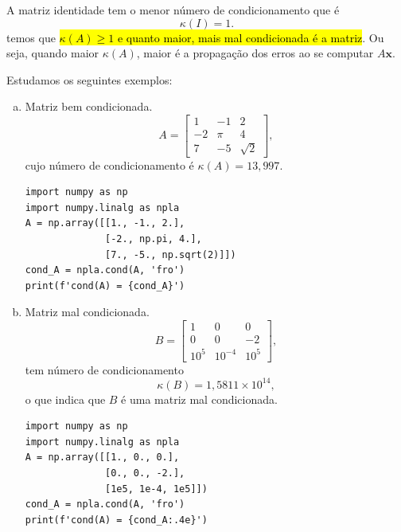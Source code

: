 A matriz identidade tem o menor número de condicionamento que é
\begin{equation}
  \kappa(I) = 1.
\end{equation}
temos que \hl{$\kappa(A) \geq 1$ e quanto maior, mais mal condicionada é a matriz}. Ou seja, quando maior $\kappa(A)$, maior é a propagação dos erros ao se computar $A\pmb{x}$.

\begin{ex}\label{ex:kappa}
  Estudamos os seguintes exemplos:
  \begin{enumerate}[a)]
  \item Matriz bem condicionada.
    \begin{equation}
      A =
      \begin{bmatrix}
        1 & -1 & 2\\
        -2 & \pi & 4\\
        7 & -5 & \sqrt{2}
      \end{bmatrix},
    \end{equation}
    cujo número de condicionamento é $\kappa(A) = 13,997$.
\begin{lstlisting}
import numpy as np
import numpy.linalg as npla
A = np.array([[1., -1., 2.],
              [-2., np.pi, 4.],
              [7., -5., np.sqrt(2)]])
cond_A = npla.cond(A, 'fro')
print(f'cond(A) = {cond_A}')
\end{lstlisting}

  \item Matriz mal condicionada.
    \begin{equation}
      B =
      \begin{bmatrix}
        1 & 0 & 0\\
        0 & 0 & -2\\
        10^{5} & 10^{-4} & 10^{5}
      \end{bmatrix},    
    \end{equation}
    tem número de condicionamento
    \begin{equation}
      \kappa(B) = 1,5811\times 10^{14},
    \end{equation}
    o que indica que $B$ é uma matriz mal condicionada.
\begin{lstlisting}
import numpy as np
import numpy.linalg as npla
A = np.array([[1., 0., 0.],
              [0., 0., -2.],
              [1e5, 1e-4, 1e5]])
cond_A = npla.cond(A, 'fro')
print(f'cond(A) = {cond_A:.4e}')
\end{lstlisting}
  \end{enumerate}
\end{ex}

